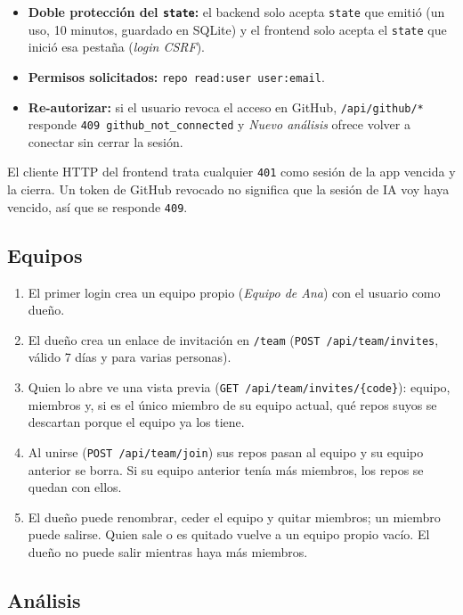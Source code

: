 \documentclass[11pt,a4paper]{article}
\newcommand{\code}[1]{\texttt{\small #1}}
\newcommand{\ruta}[1]{\texttt{\small\color{branddark}#1}}
\begin{document}
\begin{itemize}
  \item \textbf{Doble protección del \code{state}:} el backend solo acepta \code{state} que emitió (un uso, 10 minutos,
        guardado en SQLite) y el frontend solo acepta el \code{state} que inició esa pestaña (\emph{login CSRF}).
  \item \textbf{Permisos solicitados:} \code{repo read:user user:email}.
  \item \textbf{Re-autorizar:} si el usuario revoca el acceso en GitHub, \code{/api/github/*} responde
        \code{409 github\_not\_connected} y \emph{Nuevo análisis} ofrece volver a conectar sin cerrar la sesión.
\end{itemize}

\begin{aviso}
El cliente HTTP del frontend trata cualquier \code{401} como sesión de la app vencida y la cierra. Un token de GitHub
revocado no significa que la sesión de IA voy haya vencido, así que se responde \code{409}.
\end{aviso}

\subsection{Equipos}

\begin{enumerate}
  \item El primer login crea un equipo propio (\emph{Equipo de Ana}) con el usuario como dueño.
  \item El dueño crea un enlace de invitación en \ruta{/team} (\code{POST /api/team/invites}, válido 7 días y para varias personas).
  \item Quien lo abre ve una vista previa (\code{GET /api/team/invites/\{code\}}): equipo, miembros y, si es el único
        miembro de su equipo actual, qué repos suyos se descartan porque el equipo ya los tiene.
  \item Al unirse (\code{POST /api/team/join}) sus repos pasan al equipo y su equipo anterior se borra. Si su equipo
        anterior tenía más miembros, los repos se quedan con ellos.
  \item El dueño puede renombrar, ceder el equipo y quitar miembros; un miembro puede salirse. Quien sale o es quitado
        vuelve a un equipo propio vacío. El dueño no puede salir mientras haya más miembros.
\end{enumerate}

\subsection{Análisis}
\end{document}
